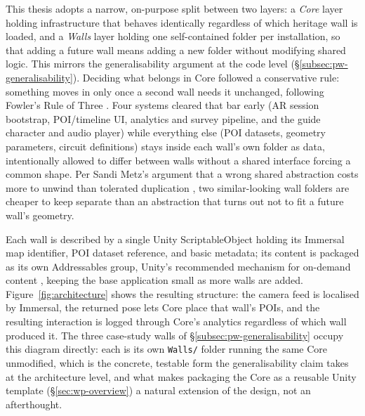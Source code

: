 \begin{aitemize}[nosep]
This thesis adopts a narrow, on-purpose split between two layers: a
\emph{Core} layer holding infrastructure that behaves identically
regardless of which heritage wall is loaded, and a \emph{Walls} layer
holding one self-contained folder per installation, so that adding a
future wall means adding a new folder without modifying shared logic.
This mirrors the generalisability argument at the code level
(\S\ref{subsec:pw-generalisability}). Deciding what belongs in Core
followed a conservative rule: something moves in only once a second wall
needs it unchanged, following Fowler's Rule of Three \cite{fowler1999}.
Four systems cleared that bar early (AR session bootstrap, POI/timeline UI, analytics and survey pipeline, and the guide character and audio player) while everything else (POI datasets, geometry
parameters, circuit definitions) stays inside each wall's own folder as
data, intentionally allowed to differ between walls without a shared
interface forcing a common shape. Per Sandi Metz's argument that a wrong
shared abstraction costs more to unwind than tolerated duplication
\cite{metz2016}, two similar-looking wall folders are cheaper to keep
separate than an abstraction that turns out not to fit a future wall's
geometry.

Each wall is described by a single Unity ScriptableObject holding its
Immersal map identifier, POI dataset reference, and basic metadata; its
content is packaged as its own Addressables group, Unity's recommended
mechanism for on-demand content \cite{unityaddressables2026}, keeping the
base application small as more walls are added. Figure~\ref{fig:architecture}
shows the resulting structure: the camera feed is localised by Immersal,
the returned pose lets Core place that wall's POIs, and the resulting
interaction is logged through Core's analytics regardless of which wall
produced it. The three case-study walls of
\S\ref{subsec:pw-generalisability} occupy this diagram directly: each is its own \texttt{Walls/} folder running the
same Core unmodified, which is the concrete, testable form the
generalisability claim takes at the architecture level, and what makes
packaging the Core as a reusable Unity template
(\S\ref{sec:wp-overview}) a natural extension of the design, not
an afterthought.

\begin{figure}[h]
\centering
{}
\end{figure}
\end{aitemize}
